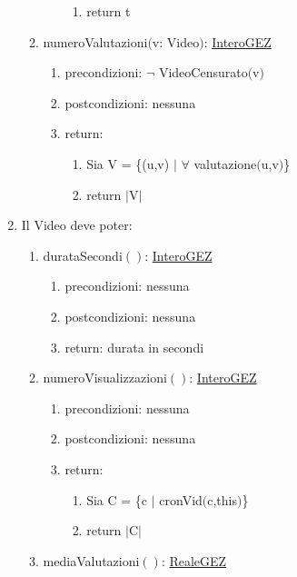 \documentclass{article}
\begin{document}
\begin{enumerate}
\begin{enumerate}
\begin{enumerate}
\begin{enumerate}
                \item return t
            \end{enumerate}
        \end{enumerate}
        \item numeroValutazioni$($v: Video$)$: \hyperref[sec:TipoInteroGEZ]{InteroGEZ}
        \begin{enumerate}
            \item precondizioni: $\neg$ VideoCensurato$($v$)$
            \item postcondizioni: nessuna
            \item return:
            \begin{enumerate}
                \item Sia V = \{(u,v) $|$ $\forall$ valutazione$($u,v$)$\}
                \item return $\mid$V$\mid$
            \end{enumerate}
        \end{enumerate}
    \end{enumerate}
    \item\label{sec:OperazioniVideo} Il Video deve poter:
    \begin{enumerate}
        \item durataSecondi$()$: \hyperref[sec:TipoInteroGEZ]{InteroGEZ}
        \begin{enumerate}
            \item precondizioni: nessuna
            \item postcondizioni: nessuna
            \item return: durata in secondi
        \end{enumerate}
        \item numeroVisualizzazioni$()$: \hyperref[sec:TipoInteroGEZ]{InteroGEZ}
        \begin{enumerate}
            \item precondizioni: nessuna
            \item postcondizioni: nessuna
            \item return:
            \begin{enumerate}
                \item Sia C = \{c $|$ cronVid$($c,this$)$\}
                \item return $\mid$C$\mid$
            \end{enumerate}
        \end{enumerate}
        \item mediaValutazioni$()$: \hyperref[sec:TipoRealeGEZ]{RealeGEZ}

\end{enumerate}
\end{enumerate}
\end{document}
